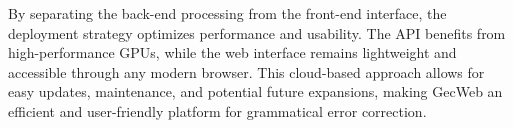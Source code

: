 By separating the back-end processing from the front-end interface, the deployment strategy optimizes performance and usability.
The API benefits from high-performance GPUs, while the web interface remains lightweight and accessible through any modern browser.
This cloud-based approach allows for easy updates, maintenance, and potential future expansions, making GecWeb an efficient and user-friendly platform for grammatical error correction.

